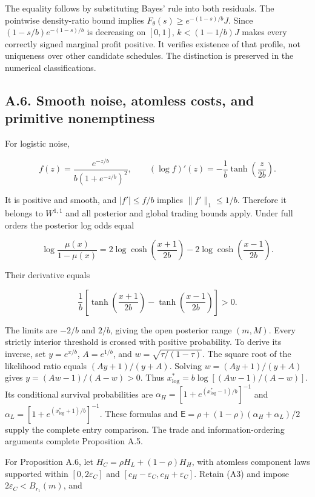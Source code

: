 \documentclass[
  11pt,
]{article}
\newcounter{none} %
\begin{document}
The equality follows by substituting Bayes' rule into both residuals.
The pointwise density-ratio bound implies
\(F_\theta(s)\ge e^{-(1-s)/b}J\). Since \((1-s/b)e^{-(1-s)/b}\) is
decreasing on \([0,1]\), \(k<(1-1/b)J\) makes every correctly signed
marginal profit positive. It verifies existence of that profile, not
uniqueness over other candidate schedules. The distinction is preserved
in the numerical classifications.

\subsection{A.6. Smooth noise, atomless costs, and primitive
nonemptiness}\label{oa-a-extensions}

For logistic noise,

\[
f(z)=\frac{e^{-z/b}}{b(1+e^{-z/b})^2},\qquad
(\log f)'(z)=-\frac1b\tanh\left(\frac z{2b}\right).
\tag{OA.23}\label{eq:oa-oa-23}
\]

It is positive and smooth, and \(|f'|\le f/b\) implies
\(\|f'\|_1\le1/b\). Therefore it belongs to \(W^{1,1}\) and all
posterior and global trading bounds apply. Under full orders the
posterior log odds equal

\[
\log\frac{\mu(x)}{1-\mu(x)}
=2\log\cosh\left(\frac{x+1}{2b}\right)
-2\log\cosh\left(\frac{x-1}{2b}\right).
\tag{OA.24}\label{eq:oa-oa-24}
\]

Their derivative equals

\[
\frac1b\left[\tanh\left(\frac{x+1}{2b}\right)-\tanh\left(\frac{x-1}{2b}\right)\right]>0.
\tag{OA.25}\label{eq:oa-oa-25}
\]

The limits are \(-2/b\) and \(2/b\), giving the open posterior range
\((m,M)\). Every strictly interior threshold is crossed with positive
probability. To derive its inverse, set \(y=e^{x/b}\), \(A=e^{1/b}\),
and \(w=\sqrt{\tau/(1-\tau)}\). The square root of the likelihood ratio
equals \((Ay+1)/(y+A)\). Solving \(w=(Ay+1)/(y+A)\) gives
\(y=(Aw-1)/(A-w)>0\). Thus \(x^*_{\log}=b\log[(Aw-1)/(A-w)]\). Its
conditional survival probabilities are
\(\alpha_H=[1+e^{(x^*_{\log}-1)/b}]^{-1}\) and
\(\alpha_L=[1+e^{(x^*_{\log}+1)/b}]^{-1}\). These formulas and
\(\mathsf E=\rho+(1-\rho)(\alpha_H+\alpha_L)/2\) supply the complete
entry comparison. The trade and information-ordering arguments complete
Proposition A.5.

For Proposition A.6, let \(H_C=\rho H_L+(1-\rho)H_H\), with atomless
component laws supported within \([0,2\varepsilon_C]\) and
\([c_H-\varepsilon_C,c_H+\varepsilon_C]\). Retain (A3) and impose
\(2\varepsilon_C<B_{r_1}(m)\), and
\end{document}
